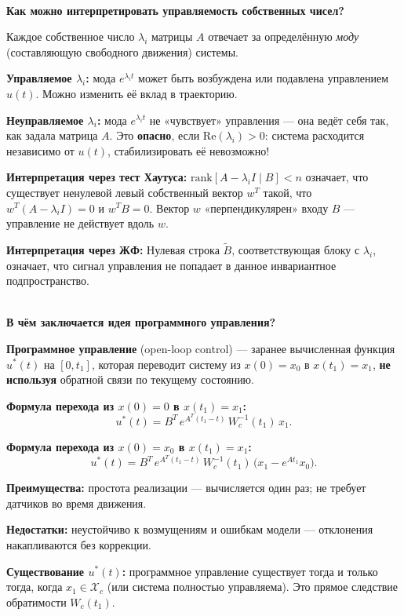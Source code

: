 \documentclass[12pt,a4paper]{article}
\begin{document}
	\begin{qblock}
		\\
		{\bfseries Как можно интерпретировать управляемость собственных чисел?}
		
		\medskip
		Каждое собственное число $\lambda_i$ матрицы $A$ отвечает за определённую
		\emph{моду} (составляющую свободного движения) системы.
		
		\medskip
		\textbf{Управляемое $\lambda_i$:} мода $e^{\lambda_i t}$ может быть возбуждена или подавлена
		управлением $u(t)$. Можно изменить её вклад в траекторию.
		
		\medskip
		\textbf{Неуправляемое $\lambda_i$:} мода $e^{\lambda_i t}$ не «чувствует» управления --- она ведёт
		себя так, как задала матрица $A$. Это \textbf{опасно}, если $\mathrm{Re}(\lambda_i) > 0$:
		система расходится независимо от $u(t)$, стабилизировать её невозможно!
		
		\medskip
		\textbf{Интерпретация через тест Хаутуса:}
		$\mathrm{rank}[A-\lambda_i I \mid B] < n$ означает, что существует ненулевой левый собственный
		вектор $w^T$ такой, что $w^T(A-\lambda_i I)=0$ и $w^T B=0$.
		Вектор $w$ «перпендикулярен» входу $B$ --- управление не действует вдоль $w$.
		
		\medskip
		\textbf{Интерпретация через ЖФ:}
		Нулевая строка $\tilde{B}$, соответствующая блоку с $\lambda_i$, означает, что сигнал управления
		не попадает в данное инвариантное подпространство.
	\end{qblock}
	
	\begin{qblock}
		\noindent{\small\bfseries\color{teal} ВОПРОС 4}\\
		{\bfseries В чём заключается идея программного управления?}
		
		\medskip
		\textbf{Программное управление} (open-loop control) --- заранее вычисленная функция $u^*(t)$
		на $[0,t_1]$, которая переводит систему из $x(0)=x_0$ в $x(t_1)=x_1$,
		\textbf{не используя} обратной связи по текущему состоянию.
		
		\medskip
		\textbf{Формула перехода из $x(0)=0$ в $x(t_1)=x_1$:}
		\[
		u^*(t) = B^T\,e^{A^T(t_1 - t)}\,W_c^{-1}(t_1)\,x_1.
		\]
		
		\textbf{Формула перехода из $x(0)=x_0$ в $x(t_1)=x_1$:}
		\[
		u^*(t) = B^T\,e^{A^T(t_1 - t)}\,W_c^{-1}(t_1)\,\bigl(x_1 - e^{At_1}x_0\bigr).
		\]
		
		\textbf{Преимущества:} простота реализации --- вычисляется один раз; не требует датчиков во время движения.
		
		\textbf{Недостатки:} неустойчиво к возмущениям и ошибкам модели --- отклонения накапливаются без коррекции.
		
		\textbf{Существование $u^*(t)$:} программное управление существует тогда и только тогда,
		когда $x_1 \in \mathcal{X}_c$ (или система полностью управляема).
		Это прямое следствие обратимости $W_c(t_1)$.
	\end{qblock}
	
\end{document}
